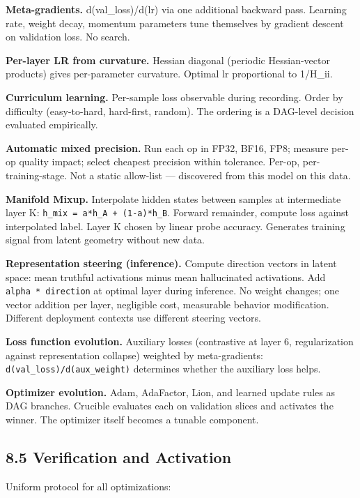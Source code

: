\textbf{Meta-gradients.} d(val\_loss)/d(lr) via one additional backward pass. Learning rate, weight decay, momentum parameters tune themselves by gradient descent on validation loss. No search.

\textbf{Per-layer LR from curvature.} Hessian diagonal (periodic Hessian-vector products) gives per-parameter curvature. Optimal lr proportional to 1/H\_ii.

\textbf{Curriculum learning.} Per-sample loss observable during recording. Order by difficulty (easy-to-hard, hard-first, random). The ordering is a DAG-level decision evaluated empirically.

\textbf{Automatic mixed precision.} Run each op in FP32, BF16, FP8; measure per-op quality impact; select cheapest precision within tolerance. Per-op, per-training-stage. Not a static allow-list --- discovered from this model on this data.

\textbf{Manifold Mixup.} Interpolate hidden states between samples at intermediate layer K: \texttt{h\_mix\ =\ a*h\_A\ +\ (1-a)*h\_B}. Forward remainder, compute loss against interpolated label. Layer K chosen by linear probe accuracy. Generates training signal from latent geometry without new data.

\textbf{Representation steering (inference).} Compute direction vectors in latent space: mean truthful activations minus mean hallucinated activations. Add \texttt{alpha\ *\ direction} at optimal layer during inference. No weight changes; one vector addition per layer, negligible cost, measurable behavior modification. Different deployment contexts use different steering vectors.

\textbf{Loss function evolution.} Auxiliary losses (contrastive at layer 6, regularization against representation collapse) weighted by meta-gradients: \texttt{d(val\_loss)/d(aux\_weight)} determines whether the auxiliary loss helps.

\textbf{Optimizer evolution.} Adam, AdaFactor, Lion, and learned update rules as DAG branches. Crucible evaluates each on validation slices and activates the winner. The optimizer itself becomes a tunable component.

\subsection{8.5 Verification and Activation}\label{verification-and-activation}

Uniform protocol for all optimizations:

